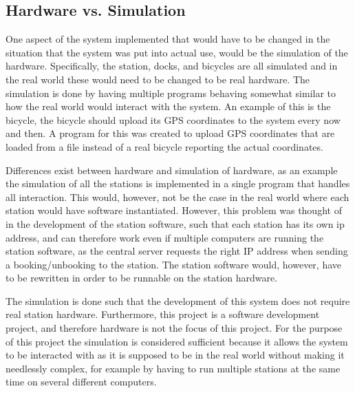 \subsection{Hardware vs. Simulation}
One aspect of the system implemented that would have to be changed in the situation that the system was put into actual use, would be the simulation of the hardware.
Specifically, the station, docks, and bicycles are all simulated and in the real world these would need to be changed to be real hardware.
The simulation is done by having multiple programs behaving somewhat similar to how the real world would interact with the system.
An example of this is the bicycle, the bicycle should upload its GPS coordinates to the system every now and then. 
A program for this was created to upload GPS coordinates that are loaded from a file instead of a real bicycle reporting the actual coordinates.

Differences exist between hardware and simulation of hardware, as an example the simulation of all the stations is implemented in a single program that handles all interaction. 
This would, however, not be the case in the real world where each station would have software instantiated.
However, this problem was thought of in the development of the station software, such that each station has its own ip address, and can therefore work even if multiple computers are running the station software, as the central server requests the right IP address when sending a booking/unbooking to the station.
The station software would, however, have to be rewritten in order to be runnable on the station hardware.

The simulation is done such that the development of this system does not require real station hardware.
Furthermore, this project is a software development project, and therefore hardware is not the focus of this project.
For the purpose of this project the simulation is considered sufficient because it allows the system to be interacted with as it is supposed to be in the real world without making it needlessly complex, for example by having to run multiple stations at the same time on several different computers.